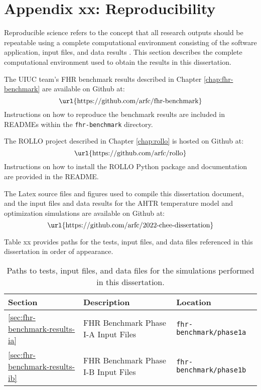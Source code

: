 \chapter{Appendix xx: Reproducibility} 

Reproducible science refers to the concept that all research outputs should be 
repeatable using a complete computational environment consisting of the software 
application, input files, and data results \cite{novak_multiscale_2020}.
This section describes the complete computational environment used to obtain the 
results in this dissertation.

The UIUC team's \gls{FHR} benchmark results described in Chapter \ref{chap:fhr-benchmark} 
are available on Github at: 
\begin{equation*}
\mbox{\url{https://github.com/arfc/fhr-benchmark}}
\end{equation*}
Instructions on how to reproduce the benchmark results are included in READMEs within 
the \texttt{fhr-benchmark} directory. 

The \gls{ROLLO} project described in Chapter \ref{chap:rollo} is hosted on Github at: 
\begin{equation*}
    \mbox{\url{https://github.com/arfc/rollo}}
\end{equation*}
Instructions on how to install the \gls{ROLLO} Python package and documentation are 
provided in the README. 

The Latex source files and figures used to compile this dissertation document, and 
the input files and data results for the AHTR temperature model and optimization 
simulations are available on Github at:  
\begin{equation*}
    \mbox{\url{https://github.com/arfc/2022-chee-dissertation}}
\end{equation*}

Table xx provides paths for the tests, input files, and data files referenced in this 
dissertation in order of appearance. 

\begin{landscape}
\begin{table}[htbp!]
    \centering
    \onehalfspacing
    \caption{Paths to tests, input files, and data files for the simulations performed 
    in this dissertation. }
    \label{tab:reproducibility}
    \footnotesize
    \begin{tabular}{lll}
    \toprule
    \textbf{Section} & \textbf{Description} & \textbf{Location} \\
    \midrule
    \ref{sec:fhr-benchmark-results-ia} & FHR Benchmark Phase I-A Input Files & 
    \texttt{fhr-benchmark/phase1a} \\ 
    \midrule
    \ref{sec:fhr-benchmark-results-ib} & FHR Benchmark Phase I-B Input Files & 
    \texttt{fhr-benchmark/phase1b} \\ 
    \bottomrule
    \end{tabular}
\end{table}
\end{landscape}